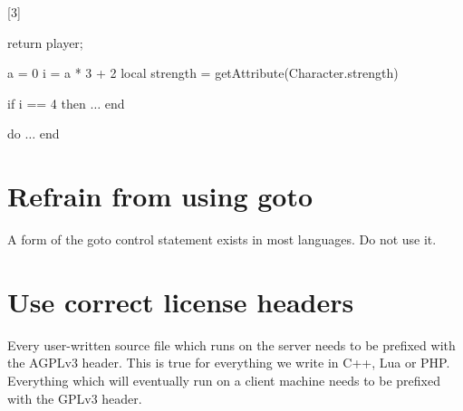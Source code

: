 \documentclass[a4paper,11pt]{scrreprt}
\newcommand{\marginMarker}[1]{%
\marginnote{%
    \hfill%
		\Huge{#1}%
}[3\baselineskip]%
}
\newcommand{\conforming}{%
\marginMarker{\textcolor{green}{\ding{51}}}%
}
\begin{document}
\conforming{}
\begin{cppBox}
return player;
\end{cppBox}
\begin{luaBox}[mathescape]
a = 0
i = a * 3 + 2
local strength = getAttribute(Character.strength)

if i == 4 then
    $\dots$
end

do
    $\dots$
end
\end{luaBox}

\section{Refrain from using goto}
A form of the goto control statement exists in most languages. Do not use it.

\section{Use correct license headers}
Every user-written source file which runs on the server needs to be prefixed with the AGPLv3 header. This is true for everything we write in C++, Lua or PHP. Everything which will eventually run on a client machine needs to be prefixed with the GPLv3 header.
\end{document}

